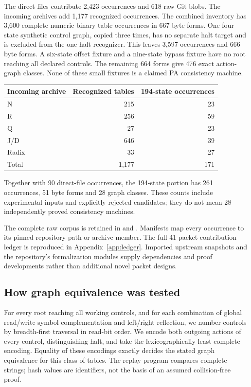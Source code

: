 \documentclass[11pt]{article}
\begin{document}
The direct files contribute 2,423 occurrences and 618 raw Git blobs. The
incoming archives add 1,177 recognized occurrences. The combined inventory
has 3,600 complete numeric binary-table occurrences in 667 byte forms.
One four-state synthetic control graph, copied three times, has no separate
halt target and is excluded from the one-halt recognizer. This leaves
3,597 occurrences and 666 byte forms. A six-state offset fixture and a
nine-state bypass fixture have no root reaching all declared controls.
The remaining 664 forms give 476 exact action-graph classes. None of these
small fixtures is a claimed PA consistency machine.

\begin{center}
\begin{tabular}{lrr}
\toprule
Incoming archive & Recognized tables & 194-state occurrences\\
\midrule
N & 215 & 23\\
R & 256 & 59\\
Q & 27 & 23\\
J/D & 646 & 39\\
Radix & 33 & 27\\
\midrule
Total & 1,177 & 171\\
\bottomrule
\end{tabular}
\end{center}
Together with 90 direct-file occurrences, the 194-state portion has
261 occurrences, 51 byte forms and 28 graph classes. These counts include
experimental inputs and explicitly rejected candidates; they do not mean
28 independently proved consistency machines.



The complete raw corpus is retained in  and
. Manifests map every occurrence to its
pinned repository path or archive member. The full 41-packet contribution
ledger is reproduced in Appendix~\ref{app:ledger}. Imported upstream
snapshots and the repository's formalization modules supply dependencies
and proof developments rather than additional novel packet designs.

\subsection{How graph equivalence was tested}

For every root reaching all working controls, and for each combination of
global read/write symbol complementation and left/right reflection, we
number controls by breadth-first traversal in read-bit order. We encode
both outgoing actions of every control, distinguishing halt, and take the
lexicographically least complete encoding. Equality of these encodings
exactly decides the stated graph equivalence for this class of tables.
The replay program compares complete strings; hash values are identifiers,
not the basis of an assumed collision-free proof.
\end{document}
